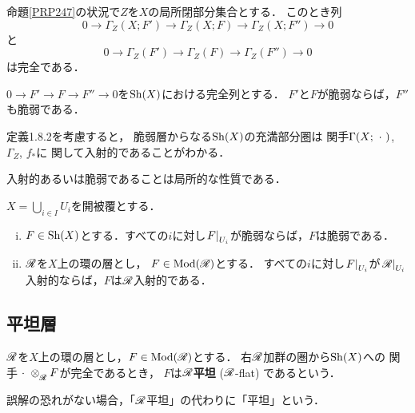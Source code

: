 \begin{leftbar}
\begin{CRL}\label{CRL248}
    命題\ref{PRP247}の状況で\(Z\)を\(X\)の局所閉部分集合とする．
    このとき列\[
        0\to\Gamma_{Z}(X;F')\to\Gamma_{Z}(X;F)\to\Gamma_{Z}(X;F'')\to0
    \]と\[
        0\to\Gamma_{Z}(F')\to\Gamma_{Z}(F)\to\Gamma_{Z}(F'')\to0
    \]は完全である．
\end{CRL}
\end{leftbar}
    
\begin{leftbar}
\begin{CRL}\label{CRL249}
    \(0\to F'\to F\to F''\to0\)を\(\Sh(X)\)における完全列とする．
    \(F'\)と\(F\)が脆弱ならば，\(F''\)も脆弱である．
\end{CRL}
\end{leftbar}

定義1.8.2を考慮すると，
脆弱層からなる\(\Sh(X)\)の充満部分圏は
関手\(\Gamma(X;\blk)\), \(\Gamma_{Z}\), \(f_{\ast}\)に
関して入射的であることがわかる．

入射的あるいは脆弱であることは局所的な性質である．

\begin{leftbar}
\begin{PRP}\label{PRP2410}
    \(X=\bigcup_{i\in I}U_{i}\)を開被覆とする．
    \begin{enumerate}[(i)]
        \item \(F\in\Sh(X)\)とする．すべての\(i\)に対し\(\mres[F]{U_{i}}\)が脆弱ならば，\(F\)は脆弱である．
        \item \(\scR\)を\(X\)上の環の層とし，
        \(F\in\Mod(\scR)\)とする．
        すべての\(i\)に対し\(\mres[F]{U_{i}}\)が\(
            \mres[\scR]{U_{i}}
        \)入射的ならば，\(F\)は\(\scR\)入射的である．
    \end{enumerate}
\end{PRP}
\end{leftbar}
\subsection*{平坦層}

\begin{DFN}\label{DFN2411}
    \(\scR\)を\(X\)上の環の層とし，\(F\in\Mod(\scR)\)とする．
    右\(\scR\)加群の圏から\(\Sh(X)\)への
    関手\(\blk\ttens[\scR]F\)が完全であるとき，
    \(F\)は\(\scR\)\textbf{平坦} (\(\scR\)-flat) であるという．
\end{DFN}

誤解の恐れがない場合，「\(\scR\)平坦」の代わりに「平坦」という．

